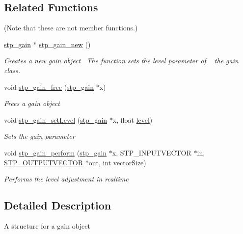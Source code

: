 \subsection*{Related Functions}
(Note that these are not member functions.) \begin{DoxyCompactItemize}
\item 
\hyperlink{structstp__gain}{stp\+\_\+gain} $\ast$ \hyperlink{structstp__gain_a0979540c2a80ff589d209066faa0a5e9}{stp\+\_\+gain\+\_\+new} ()
\begin{DoxyCompactList}\small\item\em Creates a new gain object~\newline
 The function sets the level parameter of ~\newline
 the gain class. \end{DoxyCompactList}\item 
void \hyperlink{structstp__gain_ab36b939e4336809ad301f890303d98f9}{stp\+\_\+gain\+\_\+free} (\hyperlink{structstp__gain}{stp\+\_\+gain} $\ast$x)
\begin{DoxyCompactList}\small\item\em Frees a gain object~\newline
 \end{DoxyCompactList}\item 
void \hyperlink{structstp__gain_a40ce3451f3a3bf7bc7fe73e84d0cdfbe}{stp\+\_\+gain\+\_\+set\+Level} (\hyperlink{structstp__gain}{stp\+\_\+gain} $\ast$x, float \hyperlink{structstp__gain_a450c3ab9b94a4663caad892b7193b547}{level})
\begin{DoxyCompactList}\small\item\em Sets the gain parameter ~\newline
 \end{DoxyCompactList}\item 
void \hyperlink{structstp__gain_a2405b0c38009081fd715433b07971946}{stp\+\_\+gain\+\_\+perform} (\hyperlink{structstp__gain}{stp\+\_\+gain} $\ast$x, S\+T\+P\+\_\+\+I\+N\+P\+U\+T\+V\+E\+C\+T\+OR $\ast$in, \hyperlink{stp__defines_8h_a58d557086e49ac00da395104c8fb500b}{S\+T\+P\+\_\+\+O\+U\+T\+P\+U\+T\+V\+E\+C\+T\+OR} $\ast$out, int vector\+Size)
\begin{DoxyCompactList}\small\item\em Performs the level adjustment in realtime ~\newline
 \end{DoxyCompactList}\end{DoxyCompactItemize}


\subsection{Detailed Description}
A structure for a gain object ~\newline
 

